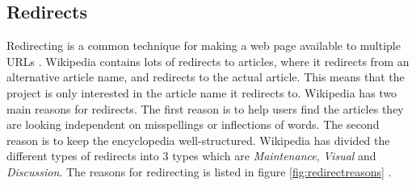 \subsection{Redirects}
Redirecting is a common technique for making a web page available to multiple URLs \cite{wiki:urlredirect}. Wikipedia contains lots of redirects to articles, where it redirects from an alternative article name, and redirects to the actual article.  This means that the project is only interested in the article name it redirects to. Wikipedia has two main reasons for redirects. The first reason is to help users find the articles they are looking  independent on misspellings or inflections of words. The  second reason is to keep the encyclopedia well-structured. Wikipedia has divided the different types of redirects into 3 types which are \emph{Maintenance}, \emph{Visual} and \emph{Discussion}. The reasons for redirecting is listed in figure \ref{fig:redirectreasons} \cite{wiki:redirect}.

